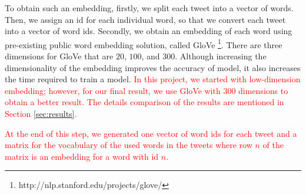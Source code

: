 \documentclass[8pt,conference,compsocconf]{IEEEtran}
\begin{document}
To obtain such an embedding, firstly, we split each tweet into a vector of words. Then, we assign an id for each individual word, so that we convert each tweet into a vector of word ids. Secondly, we obtain an embedding of each word using pre-existing public word embedding solution, called GloVe \footnote{http://nlp.stanford.edu/projects/glove/}. There are three dimensions for GloVe that are $20$, $100$, and $300$. Although increasing the dimensionality of the embedding improves the accuracy of model, it also increases the time required to train a model. \textcolor{red}{In this project, we started with low-dimension embedding; however, for our final result, we use GloVe with $300$ dimensions to obtain a better result. The details comparison of the results are mentioned in Section \ref{sec:results}.}

\textcolor{red}{At the end of this step, we generated one vector of word ids for each tweet and a matrix for the vocabulary of the used words in the tweets where row $n$ of the matrix is an embedding for a word with id $n$.}

\end{document}
